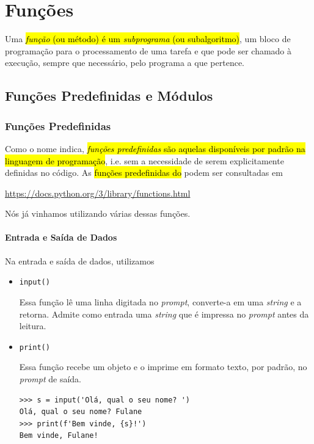 
\chapter{Funções}\label{cap_fun}
\thispagestyle{fancy}

Uma \hl{\emph{função} (ou método) é um \emph{subprograma} (ou subalgoritmo)}, um bloco de programação para o processamento de uma tarefa e que pode ser chamado à execução, sempre que necessário, pelo programa a que pertence.

\section{Funções Predefinidas e Módulos}\label{cap_fun_sec_buildin}

\subsection{Funções Predefinidas}

Como o nome indica, \hl{\emph{funções predefinidas} são aquelas disponíveis por padrão na linguagem de programação}, i.e. sem a necessidade de serem explicitamente definidas no código. As \hl{funções predefinidas do {\python}} podem ser consultadas em
\begin{center}
  \url{https://docs.python.org/3/library/functions.html}
\end{center}

Nós já vinhamos utilizando várias dessas funções.

\subsubsection{Entrada e Saída de Dados}

Na entrada e saída de dados, utilizamos
\begin{itemize}
\item \lstinline+input()+ 

  Essa função lê uma linha digitada no \textit{prompt}, converte-a em uma \textit{string} e a retorna. Admite como entrada uma \textit{string} que é impressa no \textit{prompt} antes da leitura.

\item \lstinline+print()+ 

  Essa função recebe um objeto e o imprime em formato texto, por padrão, no \textit{prompt} de saída.

\begin{lstlisting}
>>> s = input('Olá, qual o seu nome? ')
Olá, qual o seu nome? Fulane
>>> print(f'Bem vinde, {s}!')
Bem vinde, Fulane!
\end{lstlisting}

\end{itemize}

